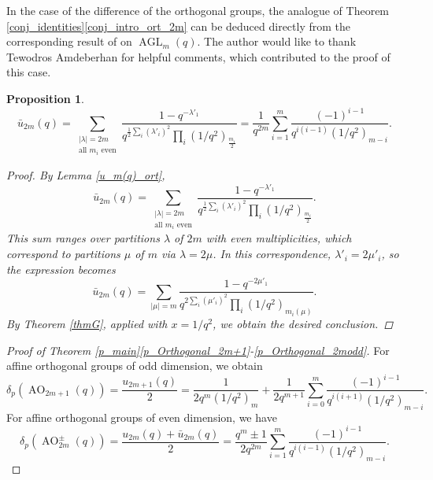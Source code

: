 \documentclass[a4paper, 12pt, oneside]{amsart}
\newtheorem{prop}{Proposition}[section]
\theoremstyle{definition}
\DeclareMathOperator{\AGL}{AGL}
\DeclareMathOperator{\AO}{AO}
\begin{document}
In the case of the difference of the orthogonal groups, the analogue of Theorem \ref{conj_identities}\eqref{conj_intro_ort_2m} can be deduced directly from the corresponding result of \cite{SpigaAGL} on $\AGL_m(q)$. The author would like to thank Tewodros Amdeberhan for helpful comments, which contributed to the proof of this case. 
\begin{prop}
\label{prop_bar{u}}
$$\bar{u}_{2m}(q)=\sum_{\substack{|\lambda|=2m\\ \text{all }m_i \text{ even}}}\frac{1-q^{-\lambda'_1}}{q^{\frac{1}{2}\sum_i (\lambda'_i)^2}\prod_i(1/q^2)_{\frac{m_i}{2}}}=\frac{1}{q^{2m}}\sum_{i=1}^{m}\frac{(-1)^{i-1}}{q^{i(i-1)}(1/q^2)_{m-i}}.$$
\begin{proof}
By Lemma \ref{u_m(q)_ort},
$$\bar{u}_{2m}(q)=\sum_{\substack{|\lambda|=2m\\ \text{all }m_i \text{ even}}}\frac{1-q^{-\lambda'_1}}{q^{\frac{1}{2}\sum_i (\lambda'_i)^2}\prod_i(1/q^2)_{\frac{m_i}{2}}}.$$
This sum ranges over partitions $\lambda$ of $2m$ with even multiplicities, which correspond to partitions $\mu$ of $m$ via $\lambda=2\mu$. In this correspondence, $\lambda'_i=2\mu'_i$, so the expression becomes
$$\bar{u}_{2m}(q)=\sum_{|\mu|=m}\frac{1-q^{-2\mu'_1}}{q^{2\sum_i (\mu'_i)^2}\prod_i(1/q^2)_{m_i(\mu)}}.$$
By Theorem \ref{thmG}, applied with $x=1/q^2$, we obtain the desired conclusion.
\end{proof}
\end{prop}
\begin{proof}[Proof of Theorem \ref{p_main}\eqref{p_Orthogonal_2m+1}-\eqref{p_Orthogonal_2modd}]
For affine orthogonal groups of odd dimension, we obtain
$$\delta_p(\AO_{2m+1}(q))=\frac{u_{2m+1}(q)}{2}=\frac{1}{2q^m(1/q^2)_{m}}+\frac{1}{2q^{m+1}}\sum_{i=0}^{m}\frac{(-1)^{i-1}}{q^{i(i+1)}(1/q^2)_{m-i}}.
$$
For affine orthogonal groups of even dimension, we have
$$\delta_p(\AO^{\pm}_{2m}(q))=\frac{u_{2m}(q)+\bar{u}_{2m}(q)}{2}=\frac{q^m\pm1}{2q^{2m}}\sum_{i=1}^{m}\frac{(-1)^{i-1}}{q^{i(i-1)}(1/q^2)_{m-i}}.$$
\end{proof}
\end{document}
